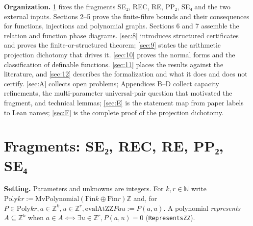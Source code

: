 \documentclass[11pt]{article}
\theoremstyle{plain}
\theoremstyle{definition}
\theoremstyle{remark}
\theoremstyle{plain}
\theoremstyle{definition}
\theoremstyle{remark}
\theoremstyle{plain}
\theoremstyle{definition}
\theoremstyle{remark}
\begin{document}
\textbf{Organization.} \cref{sec:1} fixes the fragments SE₂, REC, RE, PP₂, SE₄ and the two external inputs. Sections 2–5 prove the finite-fibre bounds and their consequences for functions, injections and polynomial graphs. Sections 6 and 7 assemble the relation and function phase diagrams. \cref{sec:8} introduces structured certificates and proves the finite-or-structured theorem; \cref{sec:9} states the arithmetic projection dichotomy that drives it. \cref{sec:10} proves the normal forms and the classification of definable functions. \cref{sec:11} places the results against the literature, and \cref{sec:12} describes the formalization and what it does and does not certify. \cref{sec:A} collects open problems; Appendices B–D collect capacity refinements, the multi-parameter universal-pair question that motivated the fragment, and technical lemmas; \cref{sec:E} is the statement map from paper labels to Lean names; \cref{sec:F} is the complete proof of the projection dichotomy.

\section{Fragments: SE₂, REC, RE, PP₂, SE₄}\label{sec:1}
\textbf{Setting.} Parameters and unknowns are integers. For $k, r ∈ ℕ$ write $\mathrm{Poly} k r := \mathrm{MvPolynomial} (\mathrm{Fin} k ⊕ \mathrm{Fin} r) ℤ$ and, for $P ∈ \mathrm{Poly} k r, a ∈ ℤ^{k}, u ∈ ℤ^{r}, \mathrm{evalAtZZ} P a u := P(a, u)$. A polynomial \emph{represents} $A ⊆ ℤ^{k}$ when $a ∈ A ⟺ ∃ u ∈ ℤ^{r}, P(a,u) = 0$ (\texttt{RepresentsZZ}).
\end{document}
